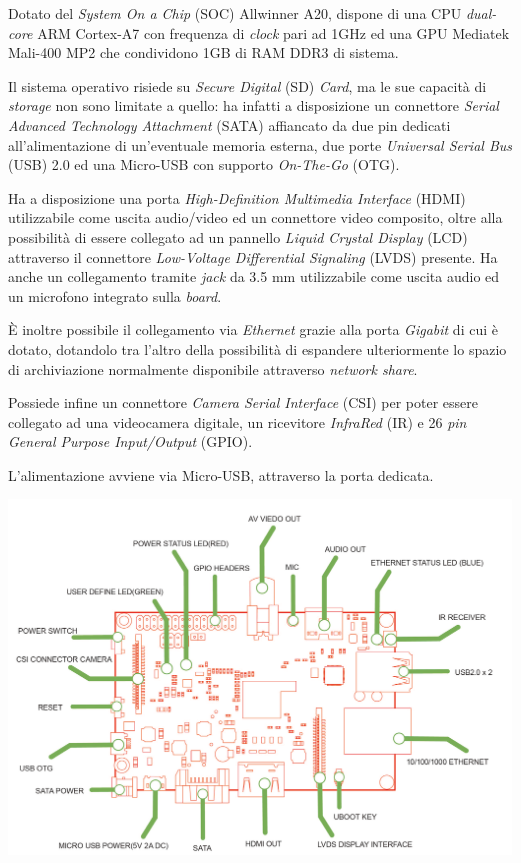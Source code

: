 Dotato del \emph{System On a Chip} (SOC) Allwinner A20, dispone di una 
CPU \emph{dual-core} ARM Cortex-A7 con frequenza di 
\textit{clock} pari ad 1GHz ed una GPU
Mediatek Mali-400 MP2 che condividono 1GB di RAM DDR3 di sistema.

Il sistema operativo risiede su \textit{Secure Digital} (SD) \textit{Card}, ma 
le sue capacità di \emph{storage} non sono limitate a quello: ha infatti a 
disposizione un connettore \textit{Serial Advanced Technology Attachment} 
(SATA) affiancato da due pin dedicati all'alimentazione di un'eventuale 
memoria esterna, due porte \textit{Universal Serial Bus} (USB) 2.0 ed una 
Micro-USB con supporto \textit{On-The-Go} (OTG).

Ha a disposizione una porta \textit{High-Definition Multimedia Interface} 
(HDMI) utilizzabile come uscita audio/video ed un connettore video composito, 
oltre alla possibilità di essere collegato ad un pannello \textit{Liquid 
Crystal Display} (LCD) attraverso il connettore \textit{Low-Voltage 
Differential Signaling} (LVDS) presente. Ha anche un collegamento tramite 
\emph{jack} da 3.5 mm utilizzabile come uscita audio ed un microfono integrato 
sulla \emph{board}.

\`E inoltre possibile il collegamento via \textit{Ethernet} grazie alla porta 
\textit{Gigabit} di cui è dotato, dotandolo tra l'altro della possibilità di 
espandere ulteriormente lo spazio di archiviazione normalmente disponibile 
attraverso \emph{network share}.

Possiede infine un connettore \textit{Camera Serial Interface} (CSI) per poter 
essere collegato ad una videocamera digitale, un ricevitore \textit{InfraRed} 
(IR) e 26 \textit{pin} \textit{General Purpose Input/Output} (GPIO).

L'alimentazione avviene via Micro-USB, attraverso la porta dedicata.

\includegraphics[width=1\textwidth]{Figures/bananapi_schema.png}